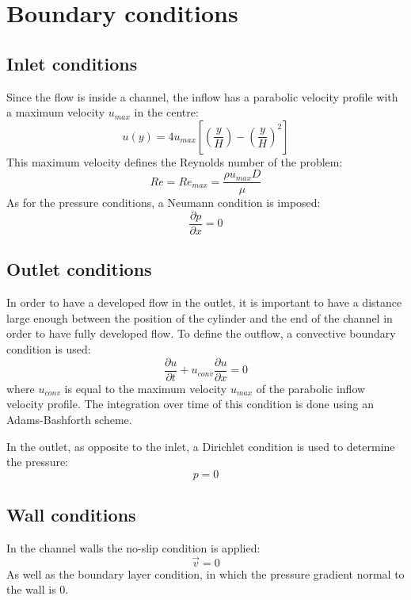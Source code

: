 \section{Boundary conditions}
\subsection{Inlet conditions}
Since the flow is inside a channel, the inflow has a parabolic velocity profile with a maximum velocity $u_{max}$ in the centre:
\begin{equation}
u\left(y\right)=4u_{max}\left[\left(\frac{y}{H}\right)-\left(\frac{y}{H}\right)^{2}\right]
\end{equation}
This maximum velocity defines the Reynolds number of the problem:
\begin{equation}
Re=Re_{max}=\frac{\rho u_{max}D}{\mu}
\end{equation}
As for the pressure conditions, a Neumann condition is imposed:
\begin{equation}
\frac{\partial p}{\partial x}=0
\end{equation}

\subsection{Outlet conditions}
In order to have a developed flow in the outlet, it is important to have a distance large enough between the position of the cylinder and the end of the channel in order to have fully developed flow. To define the outflow, a convective boundary condition is used:
\begin{equation}
\frac{\partial u}{\partial t}+u_{conv}\frac{\partial u}{\partial x}=0
\end{equation}
where $u_{conv}$ is equal to the maximum velocity $u_{max}$ of the parabolic inflow velocity profile. The integration over time of this condition is done using an Adams-Bashforth scheme.

In the outlet, as opposite to the inlet, a Dirichlet condition is used to determine the pressure:
\begin{equation}
p=0
\end{equation}

\subsection{Wall conditions}
In the channel walls the no-slip condition is applied:
\begin{equation}
\vec{v}=0
\label{noslip}
\end{equation}
As well as the boundary layer condition, in which the pressure gradient normal to the wall is 0.

